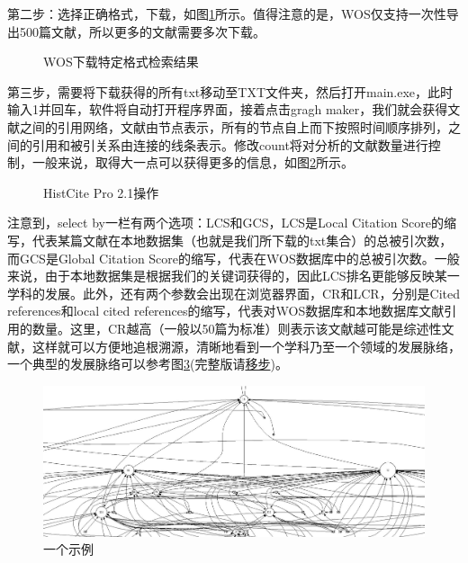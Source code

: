 \documentclass[UTF8]{ctexbook}
\begin{document}
第二步：选择正确格式，下载，如图\ref{fig:2}所示。值得注意的是，WOS仅支持一次性导出500篇文献，所以更多的文献需要多次下载。

\begin{figure}[!htb]
	\centering
	\vspace{-0.3cm}
	\caption{WOS下载特定格式检索结果}\label{fig:2}
\end{figure}

第三步，需要将下载获得的所有txt移动至TXT文件夹，然后打开main.exe，此时输入1并回车，软件将自动打开程序界面，接着点击gragh maker，我们就会获得文献之间的引用网络，文献由节点表示，所有的节点自上而下按照时间顺序排列，之间的引用和被引关系由连接的线条表示。修改count将对分析的文献数量进行控制，一般来说，取得大一点可以获得更多的信息，如图\ref{fig:3}所示。

\begin{figure}[!htb]
	\centering
	\vspace{-0.3cm}
	\caption{HistCite Pro 2.1操作}\label{fig:3}
\end{figure}


注意到，select by一栏有两个选项：LCS和GCS，LCS是Local Citation Score的缩写，代表某篇文献在本地数据集（也就是我们所下载的txt集合）的总被引次数，而GCS是Global Citation Score的缩写，代表在WOS数据库中的总被引次数。一般来说，由于本地数据集是根据我们的关键词获得的，因此LCS排名更能够反映某一学科的发展。此外，还有两个参数会出现在浏览器界面，CR和LCR，分别是Cited references和local cited references的缩写，代表对WOS数据库和本地数据库文献引用的数量。这里，CR越高（一般以50篇为标准）则表示该文献越可能是综述性文献，这样就可以方便地追根溯源，清晰地看到一个学科乃至一个领域的发展脉络，一个典型的发展脉络可以参考图\ref{fig:typical_trace}(完整版请\href{https://raw.githubusercontent.com/lonelybag/Latex_lonelybag/V1.0/Script/002_NOTE_of_MASTER/Figure/typical_trace_full.jpg}{移步})。

\begin{figure}[!htb]
	\centering
	\includegraphics[width=1\linewidth]{Figure/typical_trace.JPG}
	\vspace{-0.3cm}
	\caption{一个示例}\label{fig:typical_trace}
\end{figure}
\end{document}
